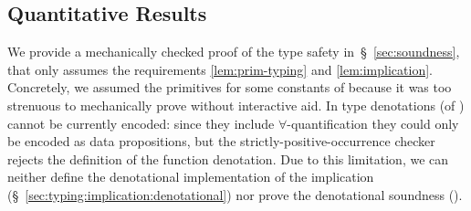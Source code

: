 %
%
%
%
%


\subsection{Quantitative Results}
\label{subsec:quantitiative}

We provide a mechanically checked
proof of the type safety in~\S~\ref{sec:soundness}, 
that only assumes the requirements
\ref{lem:prim-typing} and \ref{lem:implication}. 
%
Concretely, we assumed the primitives  for some 
constants of \sysrf because 
it was too strenuous to mechanically prove 
without interactive aid. 
%
In \lh type denotations (of ) 
cannot be currently encoded: 
since they include $\forall$-quantification
they could only be encoded as data propositions, 
but the strictly-positive-occurrence checker 
rejects the definition of the function denotation. 
Due to this limitation, 
we can neither define the denotational implementation
of the implication (\S~\ref{sec:typing:implication:denotational})
nor prove 
the denotational soundness (). 


